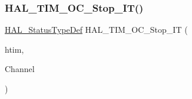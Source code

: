 \subsubsection{\texorpdfstring{H\+A\+L\+\_\+\+T\+I\+M\+\_\+\+O\+C\+\_\+\+Stop\+\_\+\+I\+T()}{HAL\_TIM\_OC\_Stop\_IT()}}
{\footnotesize\ttfamily \hyperlink{stm32f4xx__hal__def_8h_a63c0679d1cb8b8c684fbb0632743478f}{H\+A\+L\+\_\+\+Status\+Type\+Def} H\+A\+L\+\_\+\+T\+I\+M\+\_\+\+O\+C\+\_\+\+Stop\+\_\+\+IT (\begin{DoxyParamCaption}\item[{\hyperlink{struct_t_i_m___handle_type_def}{T\+I\+M\+\_\+\+Handle\+Type\+Def} $\ast$}]{htim,  }\item[{uint32\+\_\+t}]{Channel }\end{DoxyParamCaption})}

